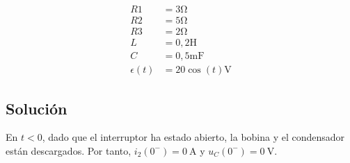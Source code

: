 \begin{minipage}{0.5\linewidth}
\end{minipage}
\begin{minipage}{0.5\linewidth}
  \begin{align*}
    R1 &= 3\unit{\ohm}\\
    R2 &= 5\unit{\ohm}\\
    R3 &= 2\unit{\ohm}\\
    L &= 0,2\unit{\henry}\\
    C &= 0,5\unit{\milli\farad}\\
    \epsilon(t) &= 20\cos(t)\unit{\volt}
  \end{align*}
\end{minipage}

\subsection*{Solución}

En $t < 0$, dado que el interruptor ha estado abierto, la bobina y el condensador están descargados. Por tanto, $i_2(0^-) = \qty{0}{\ampere}$ y $u_C(0^-) = \qty{0}{\volt}$.

